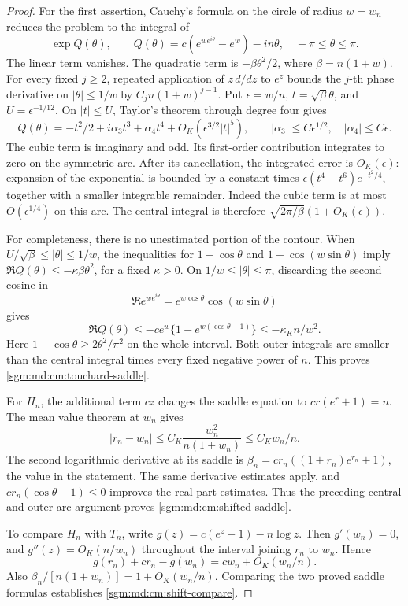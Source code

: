 \documentclass[11pt,letterpaper]{article}
\theoremstyle{remark}\newtheorem{remark}[theorem]{Remark}
\theoremstyle{definition}\newtheorem{definition}[theorem]{Definition}
\begin{document}
\begin{proof}
For the first assertion, Cauchy's formula on the circle of radius
\(w=w_n\) reduces the problem to the integral of
\[
 \exp Q(\theta),\qquad
 Q(\theta)=c(e^{we^{i\theta}}-e^w)-in\theta,\quad -\pi\le\theta\le\pi.
\]
The linear term vanishes. The quadratic term is
\(-\beta\theta^2/2\), where \(\beta=n(1+w)\).
For every fixed \(j\ge2\), repeated application of \(z\,d/dz\) to
\(e^z\) bounds the \(j\)-th phase derivative on
\(|\theta|\le1/w\) by \(C_jn(1+w)^{j-1}\).
Put \(\epsilon=w/n\), \(t=\sqrt{\beta}\theta\), and
\(U=\epsilon^{-1/12}\). On \(|t|\le U\), Taylor's theorem through
degree four gives
\[
 Q(\theta)=-t^2/2+i\alpha_3t^3+\alpha_4t^4
                 +O_K(\epsilon^{3/2}|t|^5),
 \qquad
 |\alpha_3|\le C\epsilon^{1/2},\quad
 |\alpha_4|\le C\epsilon.
\]
The cubic term is imaginary and odd. Its first-order contribution
integrates to zero on the symmetric arc. After its cancellation, the
integrated error is \(O_K(\epsilon)\): expansion of the exponential
is bounded by a constant times
\(\epsilon(t^4+t^6)e^{-t^2/4}\), together with a smaller integrable
remainder. Indeed the cubic term is at most \(O(\epsilon^{1/4})\)
on this arc. The central integral is therefore
\(\sqrt{2\pi/\beta}(1+O_K(\epsilon))\).

For completeness, there is no unestimated portion of the contour.
When \(U/\sqrt{\beta}\le|\theta|\le1/w\), the inequalities for
\(1-\cos\theta\) and \(1-\cos(w\sin\theta)\) imply
\(\Re Q(\theta)\le-\kappa\beta\theta^2\), for a fixed
\(\kappa>0\). On \(1/w\le|\theta|\le\pi\), discarding the second
cosine in
\[
 \Re e^{we^{i\theta}}=e^{w\cos\theta}\cos(w\sin\theta)
\]
gives
\[
 \Re Q(\theta)
 \le-ce^w\{1-e^{w(\cos\theta-1)}\}
 \le-\kappa_K n/w^2.
\]
Here \(1-\cos\theta\ge2\theta^2/\pi^2\) on the whole interval.
Both outer integrals are smaller than the central integral times
every fixed negative power of \(n\). This proves
\eqref{sgm:md:cm:touchard-saddle}.

For \(H_n\), the additional term \(cz\) changes the saddle equation
to \(cr(e^r+1)=n\). The mean value theorem at \(w_n\) gives
\[
 |r_n-w_n|
 \le C_K\frac{w_n^2}{n(1+w_n)}
 \le C_Kw_n/n.
\]
The second logarithmic derivative at its saddle is
\(\beta_n=cr_n((1+r_n)e^{r_n}+1)\), the value in the statement.
The same derivative estimates apply, and
\(cr_n(\cos\theta-1)\le0\) improves the real-part estimates.
Thus the preceding central and outer arc argument proves
\eqref{sgm:md:cm:shifted-saddle}.

To compare \(H_n\) with \(T_n\), write
\(g(z)=c(e^z-1)-n\log z\). Then \(g'(w_n)=0\), and
\(g''(z)=O_K(n/w_n)\) throughout the interval joining \(r_n\)
to \(w_n\). Hence
\[
 g(r_n)+cr_n-g(w_n)=cw_n+O_K(w_n/n).
\]
Also \(\beta_n/[n(1+w_n)]=1+O_K(w_n/n)\).
Comparing the two proved saddle formulas establishes
\eqref{sgm:md:cm:shift-compare}.
\end{proof}
\end{document}
